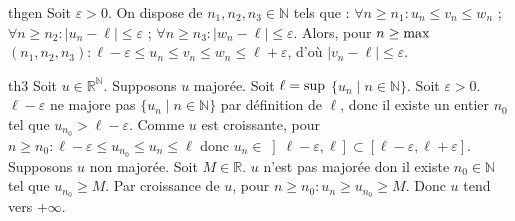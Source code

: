 \documentclass[12pt,a4paper]{report}
\begin{document}
\begin{demonstration}{thgen}
Soit $\varepsilon > 0$. On dispose de $n_1,n_2,n_3 \in \mathbb{N}$ tels que : 
\newline $\forall n \geq n_1 : u_n \leq v_n \leq w_n$ ;
\newline $\forall n \geq n_2 : \lvert u_n - \ell \rvert \leq \varepsilon$ ;
\newline $\forall n \geq n_3 : \lvert w_n - \ell \rvert \leq \varepsilon$.
\newline Alors, pour $n \geq \rm{max}$ $(n_1,n_2,n_3) : \ell-\varepsilon \leq u_n \leq v_n \leq w_n \leq \ell + \varepsilon$, d'où $\lvert v_n - \ell \rvert \leq \varepsilon$.
\end{demonstration}

\begin{demonstration}{th3}
Soit $u \in \mathbb{R}^\mathbb{N}$. Supposons $u$ majorée. Soit $\ell = \rm{sup}$ $\{u_n \mid n \in \mathbb{N}\}$.
\newline Soit $\varepsilon > 0$. $\ell-\varepsilon$ ne majore pas $\{u_n \mid n \in \mathbb{N}\}$ par définition de $\ell$, donc il existe un entier $n_0$ tel que $u_{n_0} > \ell - \varepsilon$.
\newline Comme $u$ est croissante, pour $n \geq n_0 : \ell - \varepsilon \leq u_{n_0} \leq u_n \leq \ell$ donc $u_n \in \left]\ell-\varepsilon, \ell\right] \subset \left[\ell - \varepsilon, \ell + \varepsilon\right]$.
\newline \newline Supposons $u$ non majorée. Soit $M \in \mathbb{R}$. $u$ n'est pas majorée don il existe $n_0 \in \mathbb{N}$ tel que $u_{n_0} \geq M$.
\newline Par croissance de $u$, pour $n \geq n_0 : u_n \geq u_{n_0} \geq M$. Donc $u$ tend vers $+\infty$.
\end{demonstration}
\end{document}
